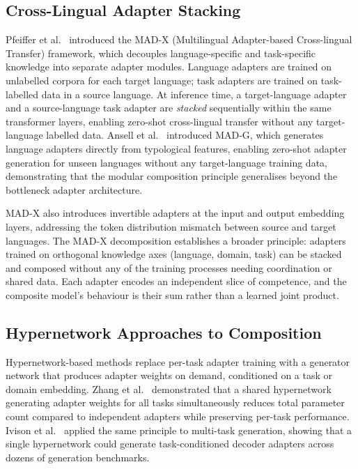 \subsection{Cross-Lingual Adapter Stacking}
\label{sec:adapter_composition:madx}

Pfeiffer et al.~\cite{PfeifferMADX2020} introduced the MAD-X (Multilingual Adapter-based Cross-lingual
Transfer) framework, which decouples language-specific and task-specific knowledge into
separate adapter modules. Language adapters are trained on unlabelled corpora for each
target language; task adapters are trained on task-labelled data in a source language.
At inference time, a target-language adapter and a source-language task adapter are
\textit{stacked} sequentially within the same transformer layers, enabling zero-shot
cross-lingual transfer without any target-language labelled data. Ansell et al.~\cite{AnsellMADG2021} introduced MAD-G, which generates language adapters directly
from typological features, enabling zero-shot adapter generation for unseen languages
without any target-language training data, demonstrating that the modular composition principle generalises beyond the bottleneck
adapter architecture.

MAD-X also introduces invertible adapters at the input and output embedding layers,
addressing the token distribution mismatch between source and target languages.
The MAD-X decomposition establishes a broader principle: adapters trained on orthogonal
knowledge axes (language, domain, task) can be stacked and composed without any of the
training processes needing coordination or shared data. Each adapter encodes an independent
slice of competence, and the composite model's behaviour is their sum rather than a
learned joint product.

\subsection{Hypernetwork Approaches to Composition}
\label{sec:adapter_composition:hyper}

Hypernetwork-based methods replace per-task adapter training with a generator network
that produces adapter weights on demand, conditioned on a task or domain embedding.
Zhang et al.~\cite{ZhangHyperPELT2022} demonstrated that a shared hypernetwork generating adapter
weights for all tasks simultaneously reduces total parameter count compared to
independent adapters while preserving per-task performance.
Ivison et al.~\cite{IvisonHyperdecoders2022} applied the same principle to multi-task generation,
showing that a single hypernetwork could generate task-conditioned decoder adapters
across dozens of generation benchmarks.

